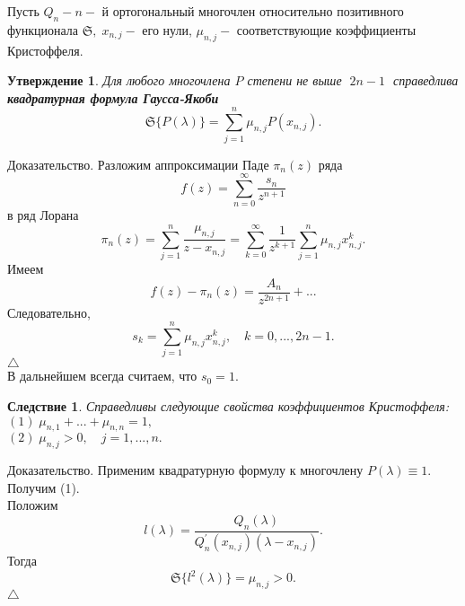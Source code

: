 \documentclass[12pt,a4paper]{article}
\theoremstyle{plain}   \newtheorem{Pro}{Задача}
\newtheorem{Sta}{Утверждение}
\newtheorem{Cor}{Следствие}
\begin{document}
Пусть
$ Q_n - n- $
й ортогональный многочлен относительно позитивного функционала
$ \mathfrak{S} , \; x_{n,j} - $
его нули,
$ \mu _{n,j} - $
соответствующие коэффициенты Кристоффеля.
\begin{Sta}
Для любого многочлена
$ P $
степени не выше
$ \; 2n-1 \; $
справедлива
{\bfseries квадратурная формула Гаусса-Якоби}
$$
  \mathfrak{S} \{ P(\lambda ) \} =
  \sum _{j=1}^n \mu _{n,j} P(x_{n,j}).
$$
\end{Sta}
{\Large Доказательство.}
Разложим аппроксимации Паде
$ \pi _n (z) $
ряда
$$
  f(z)=\sum _{n=0}^{\infty} \frac{s_n}{z^{n+1}}
$$
в ряд Лорана
$$
  \pi _n (z)= \sum _{j=1}^n \frac{\mu _{n,j}}{z-x_{n,j}}=
  \sum _{k=0}^{\infty}\frac{1}{z^{k+1}}
  \sum _{j=1}^n \mu _{n,j} x_{n,j}^k .
$$
Имеем
$$
  f(z)-\pi _n (z)=\frac{A_n}{z^{2n+1}}+...
$$
Следовательно,
$$
  s_k =\sum _{j=1}^n \mu _{n,j}x_{n,j}^k ,
  \quad k=0,...,2n-1.
$$
$ \triangle $
\\
В дальнейшем всегда считаем, что
$ s_0 =1. $
\begin{Cor}
Справедливы следующие свойства коэффициентов Кристоффеля:
\\
$ (1) \; \mu _{n,1}+...+\mu_{n,n}=1, $
\\
$ (2) \; \mu _{n,j}>0, \quad j=1,...,n. $
\end{Cor}
{\Large Доказательство.}
Применим квадратурную формулу к многочлену
$ P(\lambda )\equiv 1. $
Получим (1).\\
Положим
$$
  l(\lambda )=\frac{Q_n (\lambda )}
  {Q_n ^{\prime}(x_{n,j})(\lambda -x_{n,j})}.
$$
Тогда
$$
  \mathfrak{S} \{ l^2 (\lambda ) \} = \mu _{n,j}>0.
$$
$ \triangle $
\newpage
\end{document}
